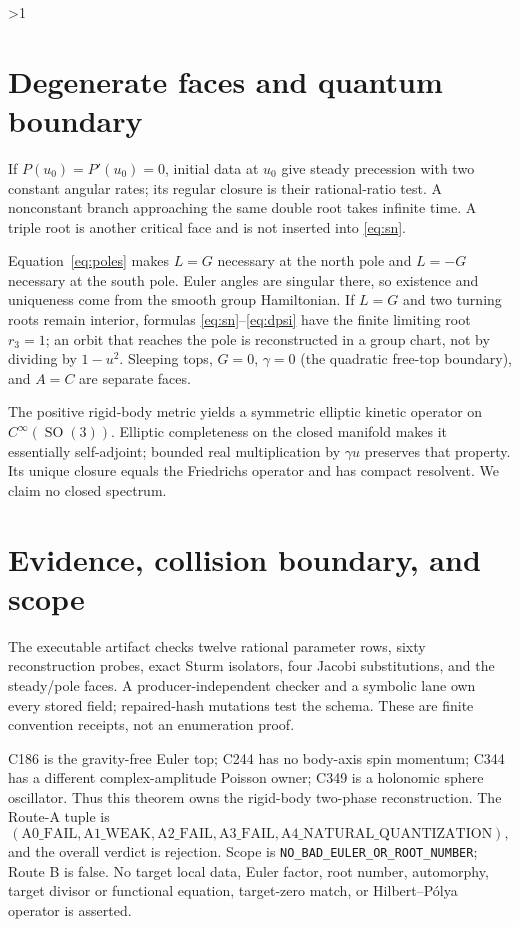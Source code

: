 \documentclass[10pt]{article}
\providecommand{\CRevisionRound}{2}
\newcommand{\SO}{\operatorname{SO}}
\begin{document}
\ifnum\CRevisionRound>1
\section{Degenerate faces and quantum boundary}
If \(P(u_0)=P'(u_0)=0\), initial data at \(u_0\) give steady precession with two
constant angular rates; its regular closure is their rational-ratio test.
A nonconstant branch approaching the same double root takes infinite time.
A triple root is another critical face and is not inserted into
\eqref{eq:sn}.

Equation~\eqref{eq:poles} makes \(L=G\) necessary at the north pole and
\(L=-G\) necessary at the south pole.  Euler angles are singular there, so
existence and uniqueness come from the smooth group Hamiltonian.  If \(L=G\)
and two turning roots remain interior, formulas
\eqref{eq:sn}--\eqref{eq:dpsi} have the finite limiting root \(r_3=1\);
an orbit that reaches the pole is reconstructed in a group chart, not by
dividing by \(1-u^2\).  Sleeping tops, \(G=0\), \(\gamma=0\) (the quadratic
free-top boundary), and \(A=C\) are separate faces.

The positive rigid-body metric yields a symmetric elliptic kinetic operator
on \(C^\infty(\SO(3))\).  Elliptic completeness on the closed manifold makes
it essentially self-adjoint; bounded real multiplication by \(\gamma u\)
preserves that property.  Its unique closure equals the Friedrichs operator
and has compact resolvent.  We claim no closed spectrum.

\section{Evidence, collision boundary, and scope}
The executable artifact checks twelve rational parameter rows, sixty
reconstruction probes, exact Sturm isolators, four Jacobi substitutions, and
the steady/pole faces.  A producer-independent checker and a symbolic lane
own every stored field; repaired-hash mutations test the schema.  These are
finite convention receipts, not an enumeration proof.

C186 is the gravity-free Euler top; C244 has no body-axis spin momentum; C344
has a different complex-amplitude Poisson owner; C349 is a holonomic sphere
oscillator.  Thus this theorem owns the rigid-body two-phase reconstruction.
The Route-A tuple is
\[
(\mathrm{A0\_FAIL},\mathrm{A1\_WEAK},\mathrm{A2\_FAIL},
 \mathrm{A3\_FAIL},\mathrm{A4\_NATURAL\_QUANTIZATION}),
\]
and the overall verdict is rejection.  Scope is
\texttt{NO\_BAD\_EULER\_OR\_ROOT\_NUMBER}; Route B is false.  No target local
data, Euler factor, root number, automorphy, target divisor or functional
equation, target-zero match, or Hilbert--P\'olya operator is asserted.
\end{document}
